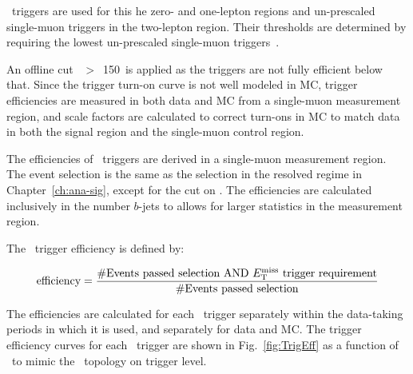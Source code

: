 \par \MET~triggers are used for this he zero- and one-lepton regions and un-prescaled single-muon triggers in the two-lepton region. 
Their thresholds are determined by requiring the lowest un-prescaled single-muon triggers~\cite{lowest_unprescaled_triggers}. 

\par An offline cut \MET~$>$~150~\GeV is applied as the triggers are not fully efficient below that. Since the trigger turn-on curve is not well modeled in MC,
 trigger efficiencies are measured in both data and MC from a single-muon measurement region, and scale factors are calculated to correct
turn-ons in MC to match data in both the signal region and the single-muon control region.

\par The efficiencies of \MET~triggers are derived in a single-muon measurement region.
The event selection is the same as the selection in the resolved regime in Chapter~\ref{ch:ana-sig}, except for the cut on \met.
The efficiencies are calculated inclusively in the number $b$-jets to allows for larger statistics in the measurement region.

\par The \MET~trigger efficiency is defined by:

\begin{equation}
    \label{eq:trigeff}
    \text{efficiency} = \frac{\text{\#Events passed selection AND \ensuremath{E_{\mathrm{T}}^{\mathrm{miss}}}~trigger requirement}}{\text{\#Events passed selection}}
\end{equation}

\par The efficiencies are calculated for each \MET~trigger separately within the data-taking periods in which it is used, and separately for data and MC.
 The trigger efficiency curves for each \MET~trigger are shown in Fig.~\ref{fig:TrigEff} as a function of \METnomu~to mimic the \MET~topology on trigger level.

